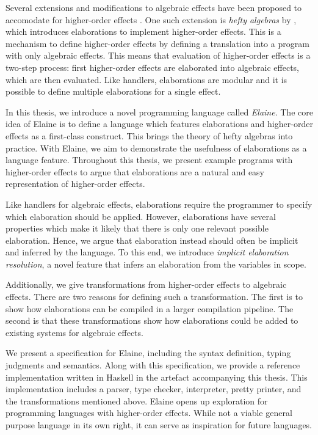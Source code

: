 Several extensions and modifications to algebraic effects have been proposed to accomodate for higher-order effects \autocite{wu_effect_2014,oh_latent_2021}. One such extension is \emph{hefty algebras} by \textcite{bach_poulsen_hefty_2023}, which introduces elaborations to implement higher-order effects. This is a mechanism to define higher-order effects by defining a translation into a program with only algebraic effects. This means that evaluation of higher-order effects is a two-step process: first higher-order effects are elaborated into algebraic effects, which are then evaluated. Like handlers, elaborations are modular and it is possible to define multiple elaborations for a single effect.

In this thesis, we introduce a novel programming language called \emph{Elaine}. The core idea of Elaine is to define a language which features elaborations and higher-order effects as a first-class construct. This brings the theory of hefty algebras into practice. With Elaine, we aim to demonstrate the usefulness of elaborations as a language feature. Throughout this thesis, we present example programs with higher-order effects to argue that elaborations are a natural and easy representation of higher-order effects.

Like handlers for algebraic effects, elaborations require the programmer to specify which elaboration should be applied. However, elaborations have several properties which make it likely that there is only one relevant possible elaboration. Hence, we argue that elaboration instead should often be implicit and inferred by the language. To this end, we introduce \emph{implicit elaboration resolution}, a novel feature that infers an elaboration from the variables in scope.

Additionally, we give transformations from higher-order effects to algebraic effects. There are two reasons for defining such a transformation. The first is to show how elaborations can be compiled in a larger compilation pipeline. The second is that these transformations show how elaborations could be added to existing systems for algebraic effects.

We present a specification for Elaine, including the syntax definition, typing judgments and semantics. Along with this specification, we provide a reference implementation written in Haskell in the artefact accompanying this thesis. This implementation includes a parser, type checker, interpreter, pretty printer, and the transformations mentioned above. Elaine opens up exploration for programming languages with higher-order effects. While not a viable general purpose language in its own right, it can serve as inspiration for future languages.

